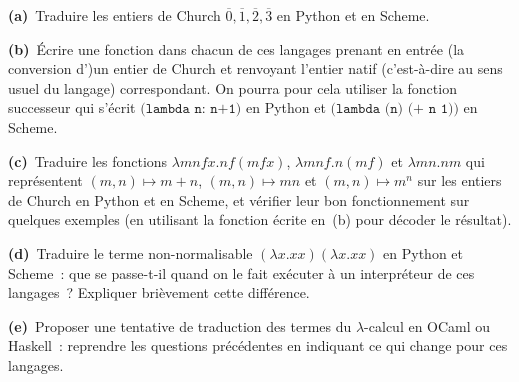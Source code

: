 \documentclass[12pt,a4paper]{article}
\theoremstyle{definition}
\begin{document}
\textbf{(a)} Traduire les entiers de Church $\overline{0},
\overline{1}, \overline{2}, \overline{3}$ en Python et en Scheme.

\textbf{(b)} Écrire une fonction dans chacun de ces langages prenant
en entrée (la conversion d')un entier de Church et renvoyant l'entier
natif (c'est-à-dire au sens usuel du langage) correspondant.  On
pourra pour cela utiliser la fonction successeur qui s'écrit
$\texttt{(lambda n: n+1)}$ en Python et $\texttt{(lambda (n) (+ n
  1))}$ en Scheme.

\textbf{(c)} Traduire les fonctions $\lambda mnfx.nf(mfx)$, $\lambda
mnf.n(mf)$ et $\lambda mn.nm$ qui représentent $(m,n)\mapsto m+n$,
$(m,n)\mapsto mn$ et $(m,n)\mapsto m^n$ sur les entiers de Church en
Python et en Scheme, et vérifier leur bon fonctionnement sur quelques
exemples (en utilisant la fonction écrite en (b) pour décoder le
résultat).

\textbf{(d)} Traduire le terme non-normalisable $(\lambda x.xx)
(\lambda x.xx)$ en Python et Scheme : que se passe-t-il quand on le
fait exécuter à un interpréteur de ces langages ?  Expliquer
brièvement cette différence.

\textbf{(e)} Proposer une tentative de traduction des termes du
$\lambda$-calcul en OCaml ou Haskell : reprendre les questions
précédentes en indiquant ce qui change pour ces langages.
\end{document}
